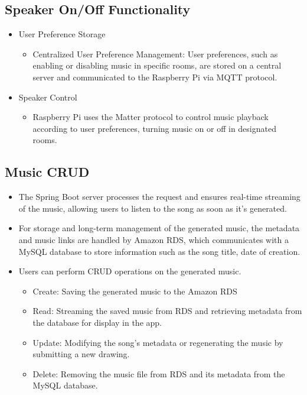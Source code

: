 \documentclass[conference]{IEEEtran}
\begin{document}
\subsection{Speaker On/Off Functionality}
\begin{itemize}
    \item User Preference Storage
\begin{itemize}
    \item Centralized User Preference Management: User preferences, such as enabling or disabling music in specific rooms, are stored on a central server and communicated to the Raspberry Pi via MQTT protocol.\\
\end{itemize}
\end{itemize}
\begin{itemize}
    \item Speaker Control
\begin{itemize}
    \item Raspberry Pi uses the Matter protocol to control music playback according to user preferences, turning music on or off in designated rooms.\\
\end{itemize}
\end{itemize}

\subsection{Music CRUD}
\begin{itemize}
    \item The Spring Boot server processes the request and ensures real-time streaming of the music, allowing users to listen to the song as soon as it's generated.\\
    \item For storage and long-term management of the generated music, the metadata and music links are handled by Amazon RDS, which communicates with a MySQL database to store information such as the song title, date of creation.\\
    \item Users can perform CRUD operations on the generated music.
\begin{itemize}
    \item Create: Saving the generated music to the Amazon RDS
    \item Read: Streaming the saved music from RDS and retrieving metadata from the database for display in the app.\\
    \item Update: Modifying the song’s metadata or regenerating the music by submitting a new drawing.\\
    \item Delete: Removing the music file from RDS and its metadata from the MySQL database.\\
\end{itemize}
\end{itemize}
\end{document}
